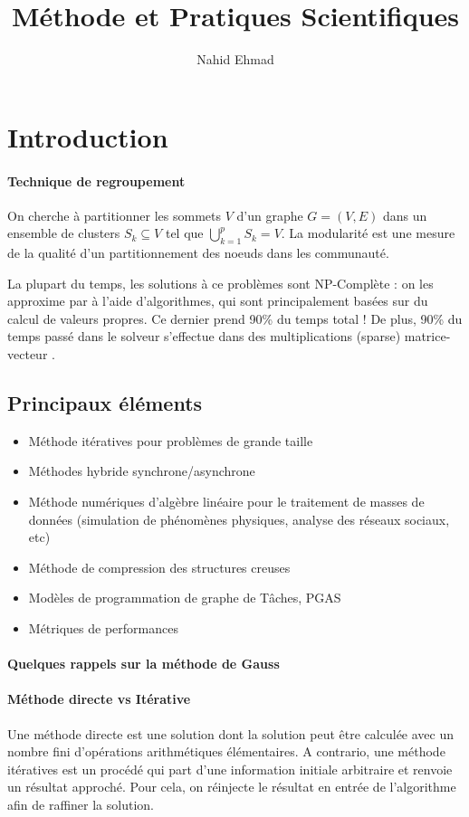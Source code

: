 \documentclass{article}
\title{Méthode et Pratiques Scientifiques}
\author{Nahid Ehmad}
\date{}
\begin{document}
\maketitle
\tableofcontents
\newpage


\section{Introduction}
\paragraph{Technique de regroupement}
On cherche à partitionner les sommets $V$ d'un graphe $G=(V,E)$ dans un ensemble de clusters $S_k\subseteq V$ tel que $\bigcup_{k=1}^{p}S_k = V$. La modularité est une mesure de la qualité d'un partitionnement des noeuds dans les communauté. 
\bigskip

La plupart du temps, les solutions à ce problèmes sont NP-Complète : on les approxime par à l'aide d'algorithmes, qui sont principalement basées sur du calcul de valeurs propres. Ce dernier prend 90\% du temps total ! De plus, 90\% du temps passé dans le solveur s'effectue dans des multiplications (sparse) matrice-vecteur .

\subsection{Principaux éléments}
\begin{itemize}
\item Méthode itératives pour problèmes de grande taille
\item Méthodes hybride synchrone/asynchrone
\item Méthode numériques d'algèbre linéaire pour le traitement de masses de données (simulation de phénomènes physiques, analyse des réseaux sociaux, etc)
\item Méthode de compression des structures creuses
\item Modèles de programmation de graphe de Tâches, PGAS
\item Métriques de performances
\end{itemize}

\paragraph{Quelques rappels sur la méthode de Gauss}

\paragraph{Méthode directe vs Itérative} Une méthode directe est une solution dont la solution peut être calculée avec un nombre fini d'opérations arithmétiques élémentaires. A contrario, une méthode itératives est un procédé qui part d'une information initiale arbitraire et renvoie un résultat approché. Pour cela, on réinjecte le résultat en entrée de l'algorithme afin de raffiner la solution.
\end{document}
